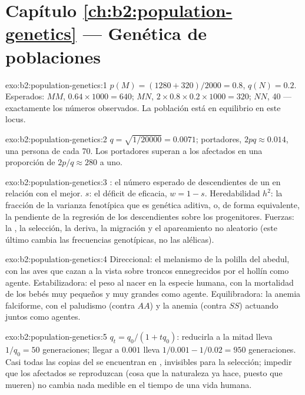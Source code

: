 \section*{Capítulo \ref{ch:b2:population-genetics} --- Genética de poblaciones}

\begin{solution}{exo:b2:population-genetics:1}
$p(M) = (1280 + 320)/2000 = 0.8$, $q(N) = 0.2$. Esperados: $MM$,
$0.64\times 1000 = 640$; $MN$, $2\times 0.8\times 0.2\times 1000 =
320$; $NN$, 40 --- exactamente los números observados. La población está
en equilibrio en este locus.
\end{solution}

\begin{solution}{exo:b2:population-genetics:2}
$q = \sqrt{1/20000} = 0.0071$; portadores, $2pq \approx 0.014$, una
persona de cada 70. Los portadores superan a los afectados en una
proporción de $2p/q \approx
280$ a uno.
\end{solution}

\begin{solution}{exo:b2:population-genetics:3}
: el número esperado de descendientes de un 
en relación con el mejor.  $s$: el déficit de
eficacia, $w = 1 -
s$. Heredabilidad $h^{2}$: la fracción de la varianza fenotípica que es
genética aditiva, o, de forma equivalente, la pendiente de la regresión
de los descendientes sobre los progenitores. Fuerzas: la , la
selección, la deriva, la migración y el apareamiento no aleatorio (este
último cambia las frecuencias genotípicas, no las alélicas).
\end{solution}

\begin{solution}{exo:b2:population-genetics:4}
Direccional: el melanismo de la polilla del abedul, con las aves que cazan
a la vista sobre troncos ennegrecidos por el hollín como agente.
Estabilizadora: el peso al nacer en la especie humana, con la mortalidad
de los bebés muy pequeños y muy grandes como agente. Equilibradora: la
anemia falciforme, con el paludismo (contra $AA$) y la anemia (contra
$SS$) actuando juntos como agentes.
\end{solution}

\begin{solution}{exo:b2:population-genetics:5}
$q_t = q_0/(1 + tq_0)$: reducirla a la mitad lleva $1/q_0 = 50$
generaciones; llegar a $0.001$ lleva $1/0.001 - 1/0.02 = 950$
generaciones. Casi todas las copias del  se encuentran en
, invisibles para la selección; impedir que los afectados se
reproduzcan (cosa que la naturaleza ya hace, puesto que mueren) no cambia
nada medible en el tiempo de una vida humana.
\end{solution}

